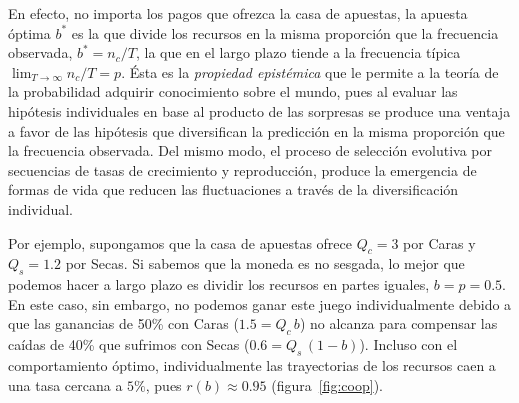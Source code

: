 \documentclass[a4paper,11pt]{book}
\theoremstyle{definition}
\begin{document}
\noindent
En efecto, no importa los pagos que ofrezca la casa de apuestas, la apuesta \'optima  $b^{*}$ es la que divide los recursos en la misma proporci\'on que la frecuencia observada, $b^{*} = n_c/T$, la que en el largo plazo tiende a la frecuencia t\'ipica $\lim_{T \rightarrow \infty} n_c/T = p$.
%
\'Esta es la \emph{propiedad epist\'emica} que le permite a la teor\'ia de la probabilidad adquirir conocimiento sobre el mundo, pues al evaluar las hip\'otesis individuales en base al producto de las sorpresas se produce una ventaja a favor de las hip\'otesis que diversifican la predicci\'on en la misma proporci\'on que la frecuencia observada.
%
Del mismo modo, el proceso de selecci\'on evolutiva por secuencias de tasas de crecimiento y reproducci\'on, produce la emergencia de formas de vida que reducen las fluctuaciones a trav\'es de la diversificaci\'on individual.


Por ejemplo, supongamos que la casa de apuestas ofrece $Q_c = 3$ por Caras y $Q_s = 1.2$ por Secas.
%
Si sabemos que la moneda es no sesgada, lo mejor que podemos hacer a largo plazo es dividir los recursos en partes iguales, $b = p = 0.5$.
En este caso, sin embargo, no podemos ganar este juego individualmente debido a que las ganancias de 50\% con Caras ($1.5 = Q_c \, b$) no alcanza para compensar las ca\'idas de 40\% que sufrimos con Secas ($0.6 = Q_s \, (1-b)$).
%
Incluso con el comportamiento \'optimo, individualmente las trayectorias de los recursos caen a una tasa cercana a $5\%$, pues $r(b) \approx 0.95$ (figura~\ref{fig:coop}).

\end{document}
